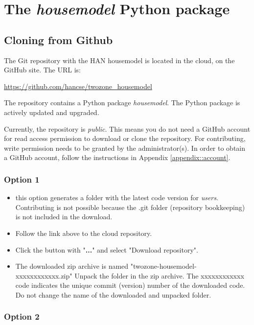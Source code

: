 \section{The \textit{housemodel} Python package}

\subsection{Cloning from Github}

The Git repository with the HAN housemodel is located in the cloud, on the GitHub site. The URL is:

\url{https://github.com/hancse/twozone_housemodel}

The repository contains a Python package \emph{housemodel}. The Python package is actively updated and upgraded.

Currently, the repository is \emph{public}. 
This means you do not need a GitHub account for read access permission to download or clone the repository. 
For contributing, write permission needs to be granted by the administrator(s). In order to obtain a GitHub account, follow the instructions in Appendix \ref{appendix::account}.


\subsubsection{Option 1}
\begin{itemize}
	\item this option generates a folder with the latest code version for \emph{users}. Contributing is not possible because the \textsf{.git} folder (repository bookkeeping) is not included in the download. 
	\item Follow the link above to the cloud repository.
	\item Click the button with "\textbf{...}" and select "Download repository".
	\item The downloaded zip archive is named "twozone-housemodel-xxxxxxxxxxxx.zip" Unpack the folder in the zip archive. The xxxxxxxxxxxx code indicates the unique commit (version) number of the downloaded code. Do not change the name of the downloaded and unpacked folder.
\end{itemize}

\subsubsection{Option 2}

